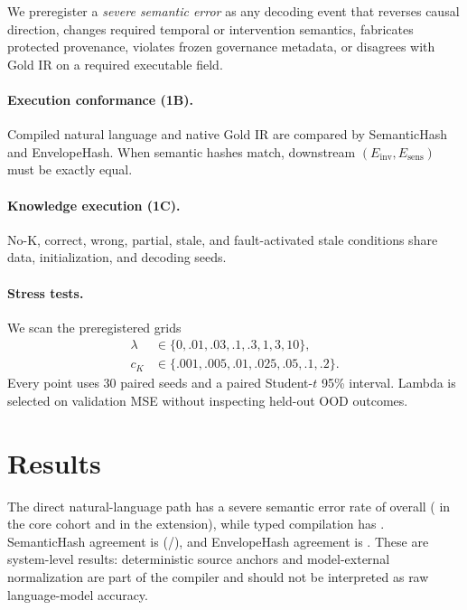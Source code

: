 \documentclass[10pt,twocolumn]{article}
\begin{document}
We preregister a \emph{severe semantic error} as any decoding event that reverses causal direction, changes required temporal or intervention semantics, fabricates protected provenance, violates frozen governance metadata, or disagrees with Gold IR on a required executable field.

\paragraph{Execution conformance (1B).}
Compiled natural language and native Gold IR are compared by SemanticHash and EnvelopeHash. When semantic hashes match, downstream $(E_{\mathrm{inv}},E_{\mathrm{sens}})$ must be exactly equal.

\paragraph{Knowledge execution (1C).}
No-K, correct, wrong, partial, stale, and fault-activated stale conditions share data, initialization, and decoding seeds.

\paragraph{Stress tests.}
We scan the preregistered grids
\begin{align*}
\lambda &\in \{0,.01,.03,.1,.3,1,3,10\},\\
c_K &\in \{.001,.005,.01,.025,.05,.1,.2\}.
\end{align*}
Every point uses 30 paired seeds and a paired Student-$t$ 95\% interval. Lambda is selected on validation MSE without inspecting held-out OOD outcomes.

\section{Results}
The direct natural-language path has a severe semantic error rate of \DirectErrorPct{} overall (\CoreDirectErrorPct{} in the core cohort and \ExtensionDirectErrorPct{} in the extension), while typed compilation has \TypedErrorPct{}. SemanticHash agreement is \SemanticMatchPct{} (\SemanticMatches{}/\TotalEvents{}), and EnvelopeHash agreement is \EnvelopeMatchPct{}. These are system-level results: deterministic source anchors and model-external normalization are part of the compiler and should not be interpreted as raw language-model accuracy.



\end{document}
